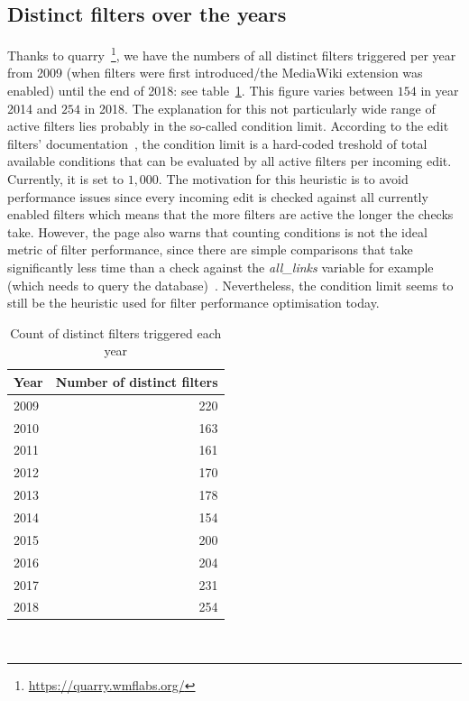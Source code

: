 \subsection{Distinct filters over the years}
Thanks to quarry~\footnote{\url{https://quarry.wmflabs.org/}}, we have the numbers of all distinct filters triggered per year
from 2009 (when filters were first introduced/the MediaWiki extension was enabled) until the end of 2018: see table~\ref{tab:active-filters-count}.
This figure varies between $154$ in year 2014 and $254$ in 2018.
The explanation for this not particularly wide range of active filters lies probably in the so-called condition limit.
According to the edit filters' documentation~\cite{Wikipedia:EditFilterDocumentation}, the condition limit is a hard-coded treshold of total available conditions that can be evaluated by all active filters per incoming edit.
Currently, it is set to $1,000$.
The motivation for this heuristic is to avoid performance issues since every incoming edit is checked against all currently enabled filters which means that the more filters are active the longer the checks take.
However, the page also warns that counting conditions is not the ideal metric of filter performance, since there are simple comparisons that take significantly less time than a check against the \emph{all\_links} variable for example (which needs to query the database)~\cite{Wikipedia:EditFilterDocumentation}.
Nevertheless, the condition limit seems to still be the heuristic used for filter performance optimisation today.

\begin{table}
  \centering
  \begin{tabular}{l r }
    Year & Number of distinct filters \\
    \hline
    2009 & 220 \\
    2010 & 163 \\
    2011 & 161 \\
    2012 & 170 \\
    2013 & 178 \\
    2014 & 154 \\
    2015 & 200 \\
    2016 & 204 \\
    2017 & 231 \\
    2018 & 254 \\
  \end{tabular}
  \caption{Count of distinct filters triggered each year}~\label{tab:active-filters-count}
\end{table}

